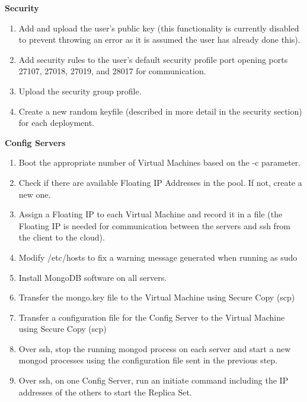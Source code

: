 \documentclass[9pt,twocolumn,twoside]{styles/osajnl}
\begin{document}
\textbf{Security}
\vspace{-\topsep}
\begin{enumerate}
\item Add and upload the user's public key (this functionality is currently disabled to prevent throwing an error as it is assumed the user has already done this).
\item Add security rules to the user's default security profile port opening ports 27107, 27018, 27019, and 28017 for communication.
\item Upload the security group profile.
\item Create a new random keyfile (described in more detail in the security section) for each deployment.
\end{enumerate}
\vspace{-\topsep}


\textbf{Config Servers}
\vspace{-\topsep}
\begin{enumerate}
\item Boot the appropriate number of Virtual Machines based on the -c parameter.
\item Check if there are available Floating IP Addresses in the pool.  If not, create a new one.
\item Assign a Floating IP to each Virtual Machine and record it in a file (the Floating IP is needed for communication between the servers and ssh from the client to the cloud).
\item Modify /etc/hosts to fix a warning message generated when running as sudo
\item Install MongoDB software on all servers.
\item Transfer the mongo.key file to the Virtual Machine using Secure Copy (scp)
\item Transfer a configuration file for the Config Server to the Virtual Machine using Secure Copy (scp)
\item Over ssh, stop the running mongod process on each server and start a new mongod processes using the configuration file sent in the previous step.
\item Over ssh, on one Config Server, run an initiate command including the IP addresses of the others to start the Replica Set.
\end{enumerate}
\vspace{-\topsep}
\end{document}
